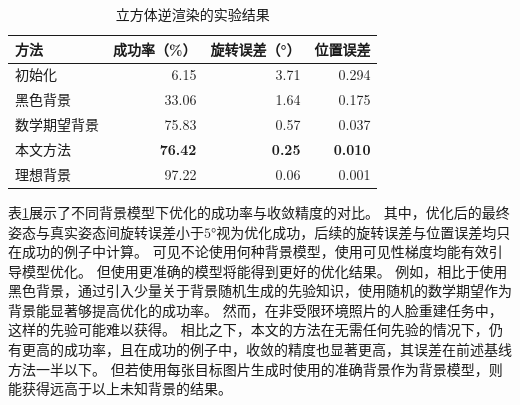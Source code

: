 \begin{table}
    \centering
    \caption{立方体逆渲染的实验结果}
    \label{tab:cube_opt}
    \begin{tabular}{l|rrr}
        \toprule
        方法       & 成功率（\%） & 旋转误差（°） & 位置误差 \\
        \midrule
        初始化      &  6.15 & 3.71 & 0.294 \\
        黑色背景    & 33.06 & 1.64 & 0.175 \\
        数学期望背景& 75.83 & 0.57 & 0.037 \\
        本文方法    & \textbf{76.42} & \textbf{0.25} & \textbf{0.010} \\
        \midrule
        理想背景    & 97.22 & 0.06 & 0.001 \\
        \bottomrule
    \end{tabular}
\end{table}
表\ref{tab:cube_opt}展示了不同背景模型下优化的成功率与收敛精度的对比。
其中，优化后的最终姿态与真实姿态间旋转误差小于$5°$视为优化成功，后续的旋转误差与位置误差均只在成功的例子中计算。
可见不论使用何种背景模型，使用可见性梯度均能有效引导模型优化。
但使用更准确的模型将能得到更好的优化结果。
例如，相比于使用黑色背景，通过引入少量关于背景随机生成的先验知识，使用随机的数学期望作为背景能显著够提高优化的成功率。
然而，在非受限环境照片的人脸重建任务中，这样的先验可能难以获得。
相比之下，本文的方法在无需任何先验的情况下，仍有更高的成功率，且在成功的例子中，收敛的精度也显著更高，其误差在前述基线方法一半以下。
但若使用每张目标图片生成时使用的准确背景作为背景模型，则能获得远高于以上未知背景的结果。

